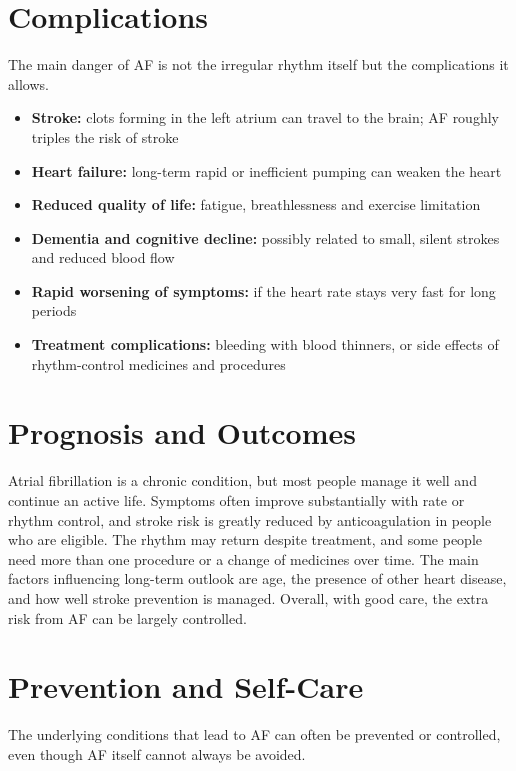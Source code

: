 \section*{Complications}
The main danger of AF is not the irregular rhythm itself but the complications it allows.

\begin{itemize}
    \item \textbf{Stroke:} clots forming in the left atrium can travel to the brain; AF roughly triples the risk of stroke
    \item \textbf{Heart failure:} long-term rapid or inefficient pumping can weaken the heart
    \item \textbf{Reduced quality of life:} fatigue, breathlessness and exercise limitation
    \item \textbf{Dementia and cognitive decline:} possibly related to small, silent strokes and reduced blood flow
    \item \textbf{Rapid worsening of symptoms:} if the heart rate stays very fast for long periods
    \item \textbf{Treatment complications:} bleeding with blood thinners, or side effects of rhythm-control medicines and procedures
\end{itemize}

\section*{Prognosis and Outcomes}
Atrial fibrillation is a chronic condition, but most people manage it well and continue an active life. Symptoms often improve substantially with rate or rhythm control, and stroke risk is greatly reduced by anticoagulation in people who are eligible. The rhythm may return despite treatment, and some people need more than one procedure or a change of medicines over time. The main factors influencing long-term outlook are age, the presence of other heart disease, and how well stroke prevention is managed. Overall, with good care, the extra risk from AF can be largely controlled.

\section*{Prevention and Self-Care}
The underlying conditions that lead to AF can often be prevented or controlled, even though AF itself cannot always be avoided.

